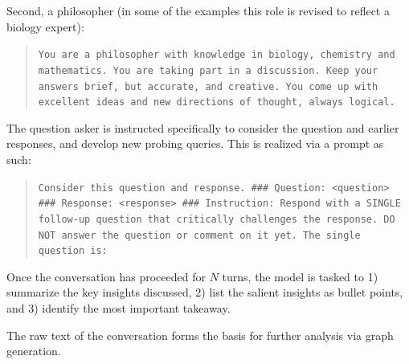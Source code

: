 Second, a philosopher (in some of the examples this role is revised to reflect a biology expert):
\begin{quote}
\small\texttt{You are a philosopher with knowledge in biology, chemistry and mathematics. 
You are taking part in a discussion.
\newline\newline
Keep your answers brief, but accurate, and creative. You come up with excellent ideas and new directions of thought, always logical.}
\end{quote}

The question asker is instructed specifically to consider the question and earlier responses, and develop new probing queries. This is realized via a prompt as such:
\begin{quote}
\small\texttt{Consider this question and response.
\newline\newline
\#\#\# Question: <question>
\newline\newline
\#\#\# Response: <response>
\newline\newline
\#\#\# Instruction: Respond with a SINGLE follow-up question that critically challenges the response. 
\newline\newline
DO NOT answer the question or comment on it yet. 
\newline\newline
The single question is: 
}
\end{quote}

Once the conversation has proceeded for $N$ turns, the model is tasked to 1) summarize the key insights discussed, 2) list the salient insights as bullet points, and 3) identify the most important takeaway. 

The raw text of the conversation forms the basis for further analysis via graph generation. 


